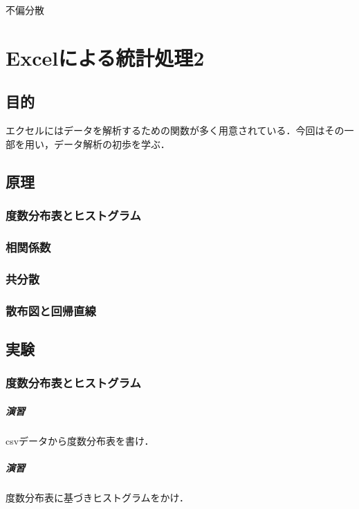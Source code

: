 \documentclass[12pt, a4j]{jreport}
\begin{document}
不偏分散

\chapter{Excelによる統計処理2}

\section{目的}

エクセルにはデータを解析するための関数が多く用意されている．今回はその一部を用い，データ解析の初歩を学ぶ．

\section{原理}

\subsection{度数分布表とヒストグラム}

\subsection{相関係数}

\subsection{共分散}

\subsection{散布図と回帰直線}


\section{実験}

\subsection{度数分布表とヒストグラム}

\paragraph{演習}
csvデータから度数分布表を書け．

\paragraph{演習}
度数分布表に基づきヒストグラムをかけ．
\end{document}
